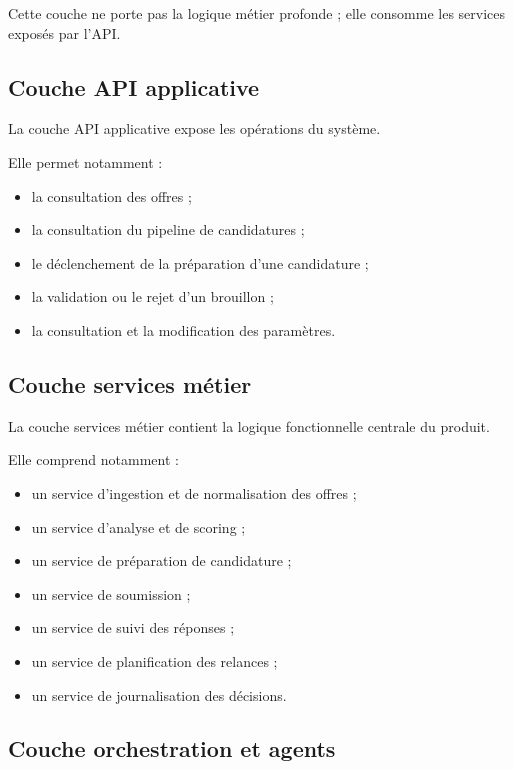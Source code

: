 \documentclass[11pt,a4paper]{article}
\begin{document}
Cette couche ne porte pas la logique métier profonde ; elle consomme les services exposés par l’API.

\subsection{Couche API applicative}

La couche API applicative expose les opérations du système.

Elle permet notamment :

\begin{itemize}
    \item la consultation des offres ;
    \item la consultation du pipeline de candidatures ;
    \item le déclenchement de la préparation d’une candidature ;
    \item la validation ou le rejet d’un brouillon ;
    \item la consultation et la modification des paramètres.
\end{itemize}

\subsection{Couche services métier}

La couche services métier contient la logique fonctionnelle centrale du produit.

Elle comprend notamment :

\begin{itemize}
    \item un service d’ingestion et de normalisation des offres ;
    \item un service d’analyse et de scoring ;
    \item un service de préparation de candidature ;
    \item un service de soumission ;
    \item un service de suivi des réponses ;
    \item un service de planification des relances ;
    \item un service de journalisation des décisions.
\end{itemize}

\subsection{Couche orchestration et agents}
\end{document}

